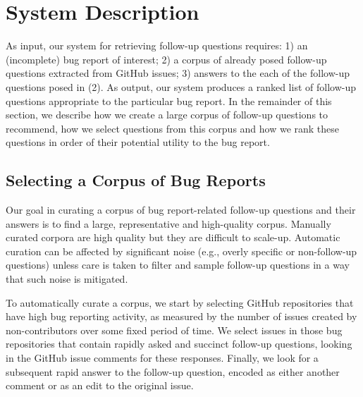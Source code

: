 \section{System Description}

As input, our system for retrieving follow-up questions requires: 1) an (incomplete) bug
report of interest; 2) a corpus of already posed follow-up questions extracted
from GitHub issues; 3) answers to the each of the follow-up questions posed in (2). As output, our system
produces a ranked list of follow-up questions appropriate to the particular bug report.
In the remainder of this section, we describe how we create a large corpus of follow-up questions
to recommend, how we select questions from this corpus and how we rank these questions in order
of their potential utility to the bug report.

\subsection{Selecting a Corpus of Bug Reports}

Our goal in curating a corpus of bug report-related follow-up questions and their answers
is to find a large, representative and high-quality corpus. Manually curated corpora are
high quality but they are difficult to scale-up. Automatic curation can be affected by
significant noise (e.g., overly specific or non-follow-up questions) unless care is taken
to filter and sample follow-up questions in a way that such noise is mitigated.

To automatically curate a corpus, we start by selecting GitHub repositories that have high bug reporting activity,
as measured by the number of issues created by non-contributors over some fixed period of time.
We select issues in those bug repositories that contain rapidly asked and succinct follow-up
questions, looking in the GitHub issue comments for these responses. Finally, we look for
a subsequent rapid answer to the follow-up question, encoded as either another comment or as an edit to the
original issue.

